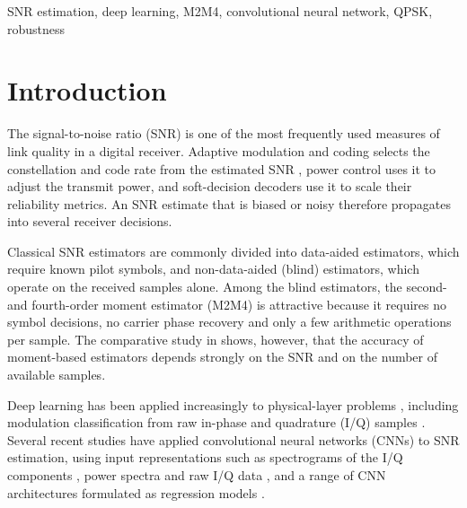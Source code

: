 \documentclass[conference]{IEEEtran}
\begin{document}
\begin{IEEEkeywords}
SNR estimation, deep learning, M2M4, convolutional neural network, QPSK, robustness
\end{IEEEkeywords}

\section{Introduction}

The signal-to-noise ratio (SNR) is one of the most frequently used measures of link quality in a digital receiver. Adaptive modulation and coding selects the constellation and code rate from the estimated SNR \cite{goldsmith1997}, power control uses it to adjust the transmit power, and soft-decision decoders use it to scale their reliability metrics. An SNR estimate that is biased or noisy therefore propagates into several receiver decisions.

Classical SNR estimators are commonly divided into data-aided estimators, which require known pilot symbols, and non-data-aided (blind) estimators, which operate on the received samples alone. Among the blind estimators, the second- and fourth-order moment estimator (M2M4) \cite{matzner1993} is attractive because it requires no symbol decisions, no carrier phase recovery and only a few arithmetic operations per sample. The comparative study in \cite{pauluzzi2000} shows, however, that the accuracy of moment-based estimators depends strongly on the SNR and on the number of available samples.

Deep learning has been applied increasingly to physical-layer problems \cite{oshea2017}, including modulation classification from raw in-phase and quadrature (I/Q) samples \cite{oshea2018}. Several recent studies have applied convolutional neural networks (CNNs) to SNR estimation, using input representations such as spectrograms of the I/Q components \cite{kojima2021}, power spectra and raw I/Q data \cite{zheng2024}, and a range of CNN architectures formulated as regression models \cite{mahbub2025}.
\end{document}
